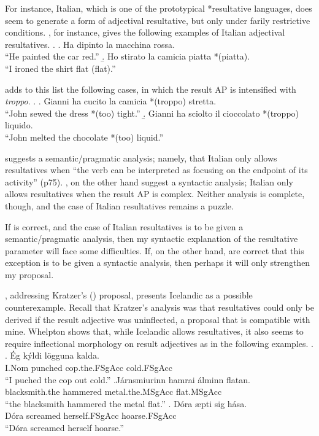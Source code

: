 \documentclass[MilwayThesis]{subfiles}
\begin{document}
For instance, Italian, which is one of the prototypical *resultative languages, does seem to generate a form of adjectival resultative, but only under farily restrictive conditions.
\textcite{napoli1992secondary}, for instance, gives the following examples of Italian adjectival resultatives.
\ex.
\a. Ha dipinto la macchina rossa.\\
``He painted the car red.''
\b. Ho stirato la camicia piatta *(piatta).\\
``I ironed the shirt flat (flat).''

\textcite{folli2005prepositions} adds to this list the following cases, in which the result AP is intensified with \textit{troppo}.
\ex.
\a. Gianni ha cucito la camicia *(troppo) stretta.\\
``John sewed the dress *(too) tight.''
\b. Gianni ha sciolto il cioccolato *(troppo) liquido.\\
``John melted the chocolate *(too) liquid.''

\textcite{napoli1992secondary} suggests a semantic/pragmatic analysis; namely, that Italian only allows resultatives when ``the verb can be interpreted as focusing on the endpoint of its activity'' (p75).
\textcite{folli2005prepositions}, on the other hand suggest a syntactic analysis; Italian only allows resultatives when the result AP is complex.
Neither analysis is complete, though, and the case of Italian resultatives remains a puzzle.

If \citeauthor{napoli1992secondary} is correct, and the case of Italian resultatives is to be given a semantic/pragmatic analysis, then my syntactic explanation of the resultative parameter will face some difficulties.
If, on the other hand, \citeauthor{folli2005prepositions} are correct that this exception is to be given a syntactic analysis, then perhaps it will only strengthen my proposal.

\textcite{whelpton2007building}, addressing Kratzer's (\citeyear{kratzer2004building}) proposal, presents Icelandic as a possible counterexample. 
Recall that Kratzer's analysis was that resultatives could only be derived if the result adjective was uninflected, a proposal that is compatible with mine.
Whelpton shows that, while Icelandic allows resultatives, it also seems to require inflectional morphology on result adjectives as in the following examples.
\ex.
\ag. \'Eg k\'yldi l\"ogguna kalda.\\
I.Nom punched cop.the.FSgAcc cold.FSgAcc\\
``I puched the cop out cold.''
\bg.J\'{a}rnsmi\dh{}urinn hamra\dh{}i \'{a}lminn flatan.\\
blacksmith.the hammered metal.the.MSgAcc flat.MSgAcc\\
``the blacksmith hammered the metal flat.''
\bg. D\'{o}ra \ae{}pti sig h\'{a}sa.\\
D\'{o}ra screamed herself.FSgAcc hoarse.FSgAcc\\
``D\'{o}ra screamed herself hoarse.''
\end{document}
